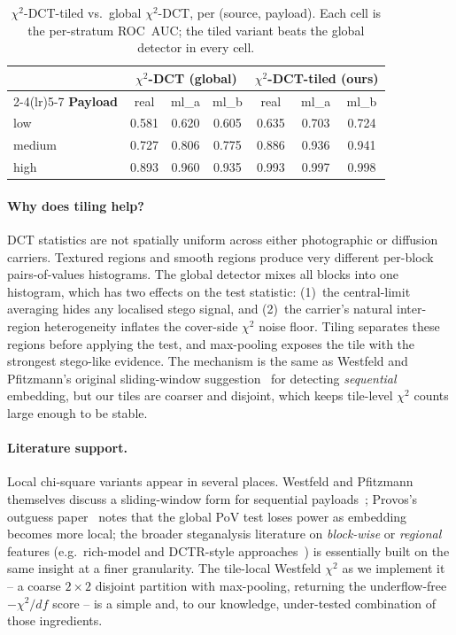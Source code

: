 \documentclass[10pt,twocolumn,a4paper]{article}
\begin{document}
\begin{table}[t]
\centering\small
\caption{$\chi^2$-DCT-tiled vs.\ global $\chi^2$-DCT, per (source, payload). Each cell is the per-stratum ROC~AUC; the tiled variant beats the global detector in every cell.}
\label{tab:tiled}
\setlength{\tabcolsep}{4pt}\renewcommand{\arraystretch}{1.1}
\begin{tabular}{@{}l c c c c c c@{}}
\toprule
& \multicolumn{3}{c}{\textbf{$\chi^2$-DCT (global)}} & \multicolumn{3}{c}{\textbf{$\chi^2$-DCT-tiled (ours)}} \\
\cmidrule(lr){2-4}\cmidrule(lr){5-7}
\textbf{Payload} & real & ml\_a & ml\_b & real & ml\_a & ml\_b \\
\midrule
low    & 0.581 & 0.620 & 0.605 & 0.635 & 0.703 & 0.724 \\
medium & 0.727 & 0.806 & 0.775 & 0.886 & 0.936 & 0.941 \\
high   & 0.893 & 0.960 & 0.935 & 0.993 & 0.997 & 0.998 \\
\bottomrule
\end{tabular}
\end{table}

\paragraph{Why does tiling help?} DCT statistics are not spatially uniform across either photographic or diffusion carriers. Textured regions and smooth regions produce very different per-block pairs-of-values histograms. The global detector mixes all blocks into one histogram, which has two effects on the test statistic: (1)~the central-limit averaging hides any localised stego signal, and (2)~the carrier's natural inter-region heterogeneity inflates the cover-side $\chi^2$ noise floor. Tiling separates these regions before applying the test, and max-pooling exposes the tile with the strongest stego-like evidence. The mechanism is the same as Westfeld and Pfitzmann's original sliding-window suggestion~\cite{westfeld1999chi} for detecting \emph{sequential} embedding, but our tiles are coarser and disjoint, which keeps tile-level $\chi^2$ counts large enough to be stable.

\paragraph{Literature support.} Local chi-square variants appear in several places. Westfeld and Pfitzmann themselves discuss a sliding-window form for sequential payloads~\cite{westfeld1999chi}; Provos's outguess paper~\cite{provos2001outguess} notes that the global PoV test loses power as embedding becomes more local; the broader steganalysis literature on \emph{block-wise} or \emph{regional} features (e.g.\ rich-model and DCTR-style approaches~\cite{fridrich2012srm,holub2015dctr}) is essentially built on the same insight at a finer granularity. The tile-local Westfeld $\chi^2$ as we implement it -- a coarse $2\!\times\!2$ disjoint partition with max-pooling, returning the underflow-free $-\chi^2/df$ score -- is a simple and, to our knowledge, under-tested combination of those ingredients.
\end{document}
